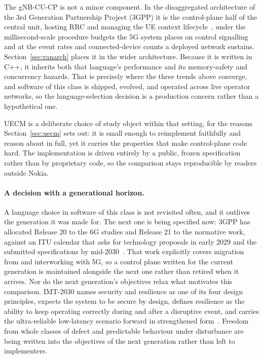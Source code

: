 \documentclass[english,oneside,a4paper,censored,csm,software-track-2020]{HYthesisML}
\begin{document}
The gNB-CU-CP is not a minor component. In the disaggregated architecture of the 3rd
Generation Partnership Project (3GPP) it is the
control-plane half of the central unit, hosting RRC and managing the UE context
lifecycle~\cite{3gpp38401,3gpp38331}, under the millisecond-scale procedure budgets the 5G system
places on control signalling~\cite{3gpp38913} and at the event rates and connected-device counts
a deployed network sustains. Section~\ref{sec:ranarch} places it in the wider architecture.
Because it is written in C++, it inherits both that language's performance and its memory-safety
and concurrency hazards. That is precisely where the three trends above converge, and software of
this class is shipped, evolved, and operated across live operator networks, so the
language-selection decision is a production concern rather than a hypothetical one.

UECM is a deliberate choice of study object within that setting, for the reasons
Section~\ref{sec:uecm} sets out: it is small enough to reimplement faithfully and reason about in
full, yet it carries the properties that make control-plane code hard. The implementation is
driven entirely by a public, frozen specification rather than by proprietary code, so the
comparison stays reproducible by readers outside Nokia.

\paragraph{A decision with a generational horizon.}
A language choice in software of this class is not revisited often, and it outlives the
generation it was made for. The next one is being specified now: 3GPP has allocated Release 20 to
the 6G studies and Release 21 to the normative work, against an ITU calendar that asks for
technology proposals in early 2029 and the submitted specifications by
mid-2030~\cite{3gpp2024road6g}. That work explicitly covers migration from and interworking with
5G, so a control plane written for the current generation is maintained alongside the next one
rather than retired when it arrives. Nor do the next generation's objectives relax what motivates
this comparison. IMT-2030 names security and resilience as one of its four design principles,
expects the system to be secure by design, defines resilience as the ability to keep operating
correctly during and after a disruptive event, and carries the ultra-reliable low-latency scenario
forward in strengthened form~\cite{itu2023imt2030}. Freedom from whole classes of defect and
predictable behaviour under disturbance are being written into the objectives of the next
generation rather than left to implementers.
\end{document}
